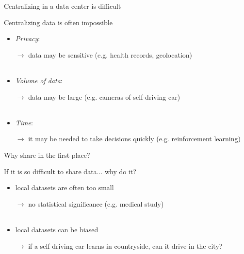\documentclass[aspectratio=169,14pt]{beamer}
\begin{document}
\begin{frame}[t]{Centralizing in a data center is difficult}

  Centralizing data is often impossible
  \pause
  \begin{itemize}
  \item \emph{Privacy}:

    {\small
    $\rightarrow$ data may be sensitive (e.g. health records, geolocation)
    }
    \\
    ~
    \pause

  \item \emph{Volume of data}:

    {\small
      $\rightarrow$ data may be large (e.g. cameras of self-driving car)
    }
    \\
    ~
    \pause
    
  \item \emph{Time}:

    {\small
    $\rightarrow$ it may be needed to take decisions quickly (e.g. reinforcement learning)
    }
    
  \end{itemize}

\end{frame}

\begin{frame}{Why share in the first place?}

  If it is so difficult to share data... why do it?
  \begin{itemize}
  \item local datasets are often too small

    {\small
      $\rightarrow$ no statistical significance (e.g. medical study)
    }
    \\
    ~
    
    
  \item local datasets can be biased

    {\small
      $\rightarrow$ if a self-driving car learns in countryside, can it drive in the city?
    }
    \\
    ~
    
        
  \end{itemize}
  
\end{frame}
\end{document}
